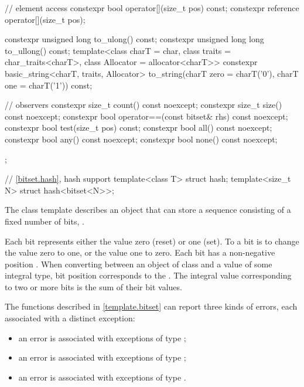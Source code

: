 \begin{codeblock}
{{    // element access
    constexpr bool operator[](size_t pos) const;
    constexpr reference operator[](size_t pos);

    constexpr unsigned long to_ulong() const;
    constexpr unsigned long long to_ullong() const;
    template<class charT = char,
             class traits = char_traits<charT>,
             class Allocator = allocator<charT>>
      constexpr basic_string<charT, traits, Allocator>
        to_string(charT zero = charT('0'), charT one = charT('1')) const;

    // observers
    constexpr size_t count() const noexcept;
    constexpr size_t size() const noexcept;
    constexpr bool operator==(const bitset& rhs) const noexcept;
    constexpr bool test(size_t pos) const;
    constexpr bool all() const noexcept;
    constexpr bool any() const noexcept;
    constexpr bool none() const noexcept;
  };

  // \ref{bitset.hash}, hash support
  template<class T> struct hash;
  template<size_t N> struct hash<bitset<N>>;
}
\end{codeblock}

\pnum
The class template
describes an object that can store a sequence consisting of a fixed number of
bits, .

\pnum
Each bit represents either the value zero (reset) or one (set).
To
a bit is to change the value zero to one, or the value one to
zero.
Each bit has a non-negative position .
When converting
between an object of class
and a value of some
integral type, bit position  corresponds to the
.
The integral value corresponding to two
or more bits is the sum of their bit values.

\pnum
The functions described in \ref{template.bitset} can report three kinds of
errors, each associated with a distinct exception:
\begin{itemize}
\item
an
error is associated with exceptions of type
;
%
\item
an
error is associated with exceptions of type
;
%
\item
an
error is associated with exceptions of type
.
%
\end{itemize}

